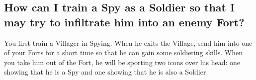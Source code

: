 \subsection{How can I train a Spy as a Soldier so that I may try to infiltrate him into an enemy Fort?}

You first train a Villager in Spying. When he exits the Village, send him into one of your Forts for a short time so that he can gain some soldiering skills. When you take him out of the Fort, he will be sporting two icons over his head: one showing that he is a Spy and one showing that he is also a Soldier.
